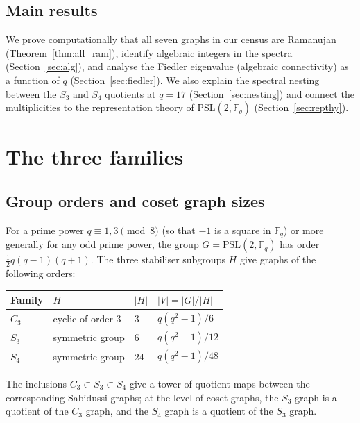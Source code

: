 \documentclass[11pt,a4paper]{amsart}
\theoremstyle{definition}
\theoremstyle{remark}
\newcommand{\PSL}[1]{\mathrm{PSL}(2,\mathbb{F}_{#1})}
\newcommand{\F}{\mathbb{F}}
\begin{document}
\subsection*{Main results}
We prove computationally that all seven graphs in our census are Ramanujan
(Theorem~\ref{thm:all_ram}), identify algebraic integers in the spectra
(Section~\ref{sec:alg}), and analyse the Fiedler eigenvalue (algebraic
connectivity) as a function of $q$ (Section~\ref{sec:fiedler}).  We also
explain the spectral nesting between the $S_3$ and $S_4$ quotients at $q=17$
(Section~\ref{sec:nesting}) and connect the multiplicities to the
representation theory of $\PSL{q}$ (Section~\ref{sec:repthy}).

\section{The three families}

\subsection{Group orders and coset graph sizes}

For a prime power $q \equiv 1, 3 \pmod{8}$ (so that $-1$ is a square in
$\F_q$) or more generally for any odd prime power, the group
$G = \PSL{q}$ has order $\tfrac{1}{2}q(q-1)(q+1)$.  The three stabiliser
subgroups $H$ give graphs of the following orders:

\begin{center}
\begin{tabular}{llll}
\toprule
Family & $H$ & $|H|$ & $|V| = |G|/|H|$ \\
\midrule
$C_3$ & cyclic of order 3 & 3 & $q(q^2-1)/6$ \\
$S_3$ & symmetric group & 6 & $q(q^2-1)/12$ \\
$S_4$ & symmetric group & 24 & $q(q^2-1)/48$ \\
\bottomrule
\end{tabular}
\end{center}

\noindent
The inclusions $C_3 \subset S_3 \subset S_4$ give a tower of quotient maps
between the corresponding Sabidussi graphs; at the level of coset graphs, the
$S_3$ graph is a quotient of the $C_3$ graph, and the $S_4$ graph is a
quotient of the $S_3$ graph.
\end{document}
